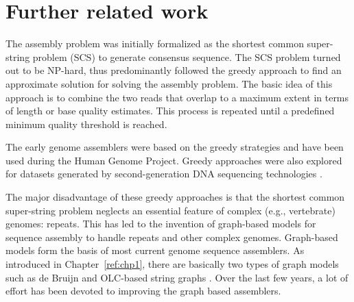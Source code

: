 
\section{Further related work}
The assembly problem was initially formalized as the shortest common super-string problem (SCS)\citep{maier1978complexity} to generate consensus sequence.
The SCS problem turned out to be NP-hard, thus \cite{tarhio1988greedy} predominantly followed the greedy approach to find an approximate solution for solving the assembly problem.
\vspace{2cm}
The basic idea of this approach is to combine the two reads that overlap to a maximum extent in terms of length or base quality estimates.
This process is repeated until a predefined minimum quality threshold is reached.

The early genome assemblers \citep{sutton1995tigr, Green99phrapdocumentation} were based on the greedy strategies and have been used during the Human Genome Project.
Greedy approaches were also explored for datasets generated by second-generation DNA sequencing technologies \citep{warren2006assembling, jeck2007extending}.

The major disadvantage of these greedy approaches is that the shortest common super-string problem neglects an essential feature of complex (e.g.,
vertebrate) genomes: repeats. This has led to the invention of graph-based models for sequence assembly to handle repeats and other complex genomes.
Graph-based models form the basis of most current genome sequence assemblers. 
As introduced in Chapter~\ref{ref:chp1}, there are basically two types of graph models such as de Bruijn \citep{pevzner2001eulerian, medvedev2007computability, todd1933combinatorial} and OLC-based string graphs \citep{myers2005fragment}.
Over the last few years, a lot of effort has been devoted to improving the graph based assemblers. 

